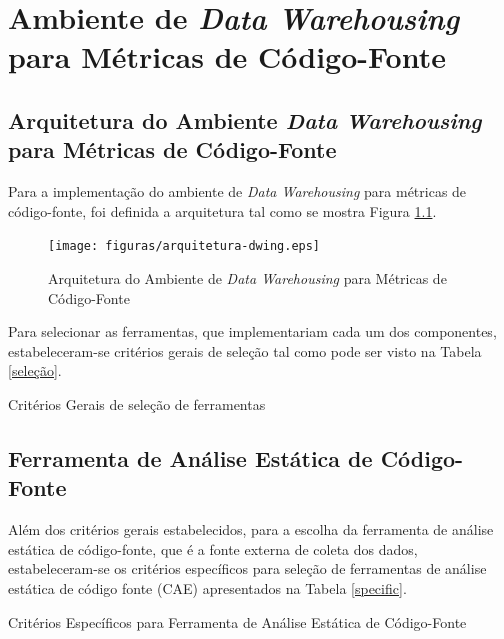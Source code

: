 \chapter{Ambiente de \textit{Data Warehousing} para Métricas de Código-Fonte}
\label{chap:arquitetura}

\section{Arquitetura do Ambiente \textit{Data Warehousing} para Métricas de Código-Fonte}
Para a implementação do ambiente de \textit{Data Warehousing} para métricas de código-fonte, foi definida a arquitetura tal como se mostra Figura \ref{arquitetura}.

\begin{figure}[ht!]
\centering
\texttt{[image: figuras/arquitetura-dwing.eps]}
\caption{Arquitetura do Ambiente de \textit{Data Warehousing} para Métricas de Código-Fonte}
\label{arquitetura}
\end{figure}
\FloatBarrier

Para selecionar as ferramentas, que implementariam cada um dos componentes, estabeleceram-se critérios gerais de seleção tal como pode ser visto na Tabela \ref{seleção}.


	\begin{table}[!ht]
	\begin{center}
	
	\caption{Critérios Gerais de seleção de ferramentas}
	\label{seleção}
	\end{center}
	\end{table}	


\section{Ferramenta de Análise Estática de Código-Fonte}

Além dos critérios gerais estabelecidos, para a escolha da ferramenta de análise estática de código-fonte, que é a fonte externa de coleta dos dados, estabeleceram-se os critérios específicos para seleção de ferramentas de análise estática de código fonte (CAE) apresentados na Tabela \ref{specific}.


	\begin{table}[!ht]
	\begin{center}
		
	\caption{Critérios Específicos para Ferramenta de Análise Estática de Código-Fonte}
	\label{specific}
	\end{center}
	\end{table}	

